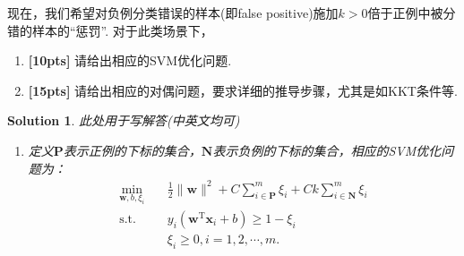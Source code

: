 \documentclass[a4paper,UTF8]{article}
\numberwithin{equation}{section}
\newtheorem*{mySol}{Solution}
\begin{document}
现在，我们希望对负例分类错误的样本(即false positive)施加$k>0$倍于正例中被分错的样本的“惩罚”. 对于此类场景下，
\begin{enumerate}[(1)]
\item \textbf{[10pts]} 请给出相应的SVM优化问题.
\item \textbf{[15pts]} 请给出相应的对偶问题，要求详细的推导步骤，尤其是如KKT条件等.
\end{enumerate}
\begin{mySol}
	此处用于写解答(中英文均可)
\begin{enumerate}[(1)]
\item 
定义$\mathbf{P}$表示正例的下标的集合，$\mathbf{N}$表示负例的下标的集合，相应的SVM优化问题为：
\begin{equation}
\begin{split}
\min_{\mathbf{w},b,\xi_i}& \quad \frac{1}{2} \lVert \mathbf{w} \rVert^2 + C\sum_{i \in \mathbf{P}}^m\xi_i + Ck\sum_{i \in \mathbf{N}}^m\xi_i\\
\text{s.t.}&  \quad y_i(\mathbf{w}^\mathrm{T}\mathbf{x}_i + b)\geq 1-\xi_i\\
& \quad \xi_i \geq 0, i = 1,2,\cdots,m.
\end{split}
\end{equation}


\end{enumerate}
\end{mySol}
\end{document}
